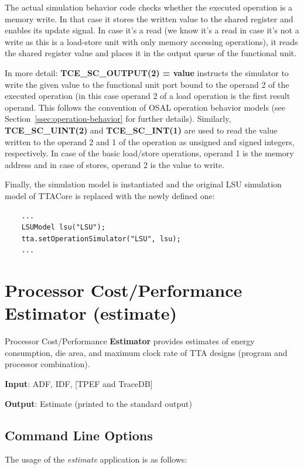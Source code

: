 \documentclass[a4paper,twoside]{tceusermanual}
\begin{document}
The actual simulation behavior code checks whether the executed
operation is a memory write. In that case it stores the written value 
to the shared register and enables its update signal. In case it's
a read (we know it's a read in case it's not a write as this is a
load-store unit with only memory accessing operations), it reads the
shared register value and places it in the output queue of the
functional unit. 

In more detail: \textbf{TCE\_SC\_OUTPUT(2) = value} instructs
the simulator to write the given value to the functional unit port
bound to the operand 2 of the executed operation (in this case operand 2
of a load operation is the first result operand. This follows the
convention of OSAL operation behavior models (see Section~\ref{ssec:operation-behavior}
for further details). Similarly, \textbf{TCE\_SC\_UINT(2)} and 
\textbf{TCE\_SC\_INT(1)}
are used to read the value written to the operand 2 and 1 of the
operation as unsigned and signed integers, respectively. In case of 
the basic load/store operations, operand 1 is the memory address and in 
case of stores, operand 2 is the value to write.

Finally, the simulation model is instantiated and the original LSU 
simulation model of TTACore is replaced with the newly defined one:

\begin{verbatim}
    ...
    LSUModel lsu("LSU");
    tta.setOperationSimulator("LSU", lsu);
    ...
\end{verbatim}


\section{Processor Cost/Performance Estimator (estimate)}
\label{section:estimate}

Processor Cost/Performance \textbf{Estimator} provides estimates of energy
consumption, die area, and maximum clock rate of TTA designs (program and
processor combination).

\textbf{Input}: ADF, IDF, [TPEF and TraceDB]

\textbf{Output}: Estimate (printed to the standard output)

\subsection{Command Line Options}

The usage of the \emph{estimate} application is as follows:
\end{document}
